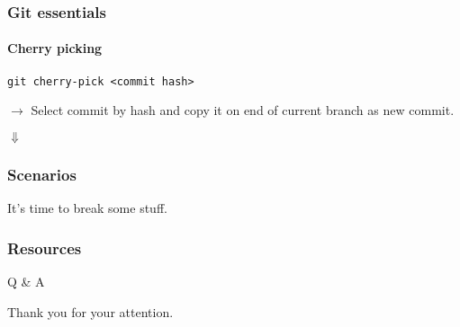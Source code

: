 \documentclass[aspectratio=169]{beamer}
\begin{document}
    \begin{frame}[fragile]
        \frametitle{Git essentials}
        \framesubtitle{Cherry picking}
        \begin{lstlisting}[gobble=12]
            git cherry-pick <commit hash>
        \end{lstlisting}
        $\rightarrow$ Select commit by hash and copy it on end of current branch as new commit.\newline
        \begin{center}$\Downarrow$\end{center}
    \end{frame}

    \begin{frame}
        \frametitle{Scenarios}
        It's time to break some stuff. 
    \end{frame}
    \begin{frame}[fragile]
        \frametitle{Resources}
        \nocite{*}
        \printbibliography     
    \end{frame}
    \begin{frame}
        \Huge{Q \& A}
    \end{frame}
    \begin{frame}
        \Huge{Thank you for your attention.}
    \end{frame}
\end{document}
